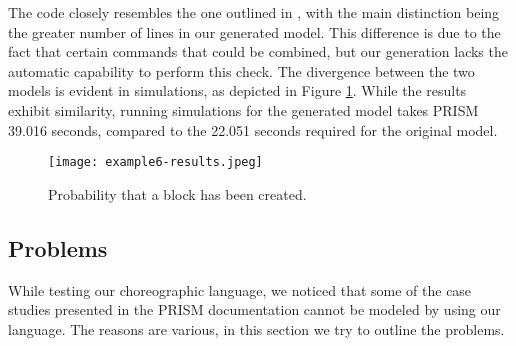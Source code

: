 \begin{comment}
   [NGRDF] (Network=0)  $\rightarrow$  
   	1 : (set2'=addBlockSet(set2,b2))$\&$(set3'=addBlockSet(set3,b3))$\&$(set4'=addBlockSet(set4,b4))$\&$(set5'=addBlockSet(set5,b5))$\&$(Network'=0); 
   [PCRLD] (Network=0)  $\rightarrow$  
   	1 : (set2'=addBlockSet(set2,b2))$\&$(set3'=addBlockSet(set3,b3))$\&$(set4'=addBlockSet(set4,b4))$\&$(set5'=addBlockSet(set5,b5))$\&$(Network'=0); 
   [MDDCF] (Network=0)  $\rightarrow$  1 : (set1' = removeBlock(set1,b1))$\&$(Network'=0); 
   [IQVPA] (Network=0)  $\rightarrow$  1 : (set1' = removeBlock(set1,b1))$\&$(Network'=0); 
   $\ldots$
endmodule

module Vote_Manager
   Vote_Manager : [0..1] init 0;
   epoch : [0..10] init 0;
   Votes : hash[];  
   tot_stake : [0..120000] init 50; 
   stake1 : [0..N] init 10; 
   stake2 : [0..N] init 10; 
   stake3 : [0..N] init 10; 
   stake4 : [0..N] init 10; 
   stake5 : [0..N] init 10; 

   [VSJBE] (Vote_Manager=0)  $\rightarrow$  
   	1 : (Votes'=addVote(Votes,b1,stake1))$\&$(Vote_Manager'=0); 
   $\ldots$
endmodule

\end{lstlisting}
\end{comment}
The code closely resembles the one outlined in \cite{DBLP:journals/distribledger/GallettaLMV23}, with the main distinction being the greater number of lines in our generated model. This difference is due to the fact that certain commands that could be combined, but our generation lacks the automatic capability to perform this check. The divergence between the two models is evident in simulations, as depicted in Figure \ref{ex5-res}. While the results exhibit similarity, running simulations for the generated model takes PRISM 39.016 seconds, compared to the 22.051 seconds required for the original model.

\begin{figure}[h]
\centering
\texttt{[image: example6-results.jpeg]}	
\caption{Probability that a block has been created.}
\label{ex5-res}
\end{figure}



\subsection{Problems}
While testing our choreographic language, we noticed that some of the case studies presented in the 
PRISM documentation \cite{PRISMdoc} cannot be modeled by using our language.
The reasons are various, in this section we try to outline the problems.

